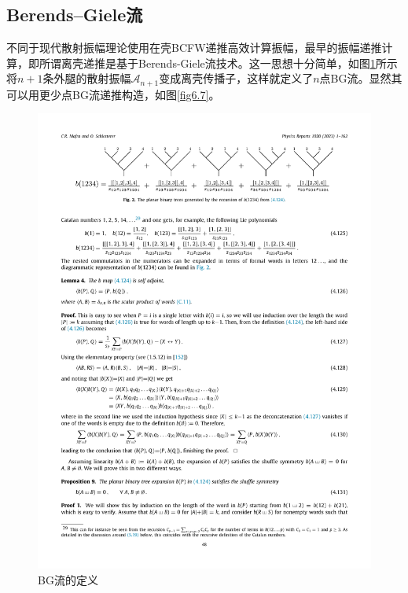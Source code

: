 \subsection{Berends–Giele流}
不同于现代散射振幅理论使用在壳BCFW递推高效计算振幅，最早的振幅递推计算，即所谓离壳递推是基于Berends-Giele流技术\cite{Berends:1987me}。这一思想十分简单，如图\ref{fig:6.6}所示将$n+1$条外腿的散射振幅$\mathcal{A}_{n+1}$变成离壳传播子，这样就定义了$n$点BG流。显然其可以用更少点BG流递推构造，如图\ref{fig6.7}。
\begin{figure}[htbp]
	\centering
	\includegraphics{figs/fig15.pdf}
	\caption{BG流的定义}
	\label{fig:6.6}
\end{figure}

